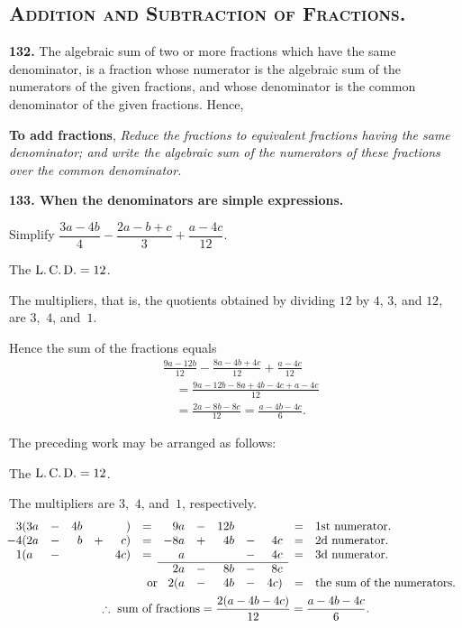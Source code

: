 \documentclass[12pt]{book}[2005/09/16]
\newcommand{\Require}[1][2\baselineskip]{%
  \setlength{\TmpLen}{\pagegoal-\pagetotal}%
  \ifthenelse{\lengthtest{0pt < \TmpLen}\and\lengthtest{\TmpLen < #1}}{%
    \vfil\newpage%
  }{}%
}
\newcommand{\Section}[1]{\subsection*{\centering\normalfont\small\scshape #1}}
\newcommand{\Paragraph}[1]{\medskip\par\textbf{#1}}
\newcommand{\Dictum}[1]{\Require\textbf{#1}}
\newenvironment{Soln}[1][]{\par\small\textsc{#1}}{\par}
\newenvironment{Theorem}[1][]{%
  \ifthenelse{\not\equal{#1}{nopar}}{\smallskip\par#1}{}%
  \itshape}{\medskip\upshape\par}
\newcommand{\Item}[1]{\vspace{4pt plus 16pt}\makebox[1em][r]{\textbf{#1}\ }}
\newlength{\TmpLen}
\newcommand{\LCD}{L.\,C.\,D.}
\begin{document}
\Section{Addition and Subtraction of Fractions.}

\Paragraph{132.}  The algebraic sum of two or more fractions which
have the same denominator, is a fraction whose numerator
is the algebraic sum of the numerators of the given fractions,
and whose denominator is the common denominator
of the given fractions.  Hence,

\Dictum{To add fractions},
\begin{Theorem}
Reduce the fractions to equivalent fractions having the
same denominator; and write the algebraic sum of the
numerators of these fractions over the common denominator.
\end{Theorem}

\Paragraph{133.  When the denominators are simple expressions.}

\Item{1.}  Simplify $\dfrac{3a - 4b}{4} - \dfrac{2a - b + c}{3} + \dfrac{a - 4c}{12}$.
\begin{Soln}
The $\text{\LCD} = 12$.

The multipliers, that is, the quotients obtained by dividing $12$ by
$4$, $3$, and $12$, are $3$,~$4$, and~$1$.

Hence the sum of the fractions equals
\begin{align*}
&\frac{9a - 12b}{12} - \frac{8a - 4b + 4c}{12} + \frac{a - 4c}{12} \\
&\quad= \frac{9a - 12b - 8a + 4b - 4c + a - 4c}{12} \\
&\quad= \frac{2a - 8b-8c}{12} = \frac{a - 4b - 4c}{6}.
\end{align*}
\end{Soln}

The preceding work may be arranged as follows:
\begin{Soln}
The $\text{\LCD} = 12$.

The multipliers are $3$,~$4$, and~$1$, respectively.
\begin{gather*}
\begin{array}{l*{5}{cr}cl}
3(3a &-& 4b & &  ) &=& 9a &-&12b & &    &=& \text{1st numerator.} \\
\llap{$-$}
4(2a &-&  b &+& c) &=&-8a &+& 4b &-& 4c &=& \text{2d numerator.} \\
1( a &-&    & &4c) &=&  a & &    &-& 4c &=& \text{3d numerator.} \\
\cline{7-11}
      & &    & &    & & 2a &-& 8b &-& 8c \\
      & &    & &    &\rlap{or}& 2(a &-& 4b &-& 4c) &=& \text{the sum of the numerators.}
\end{array} \\
\therefore\ \text{sum of fractions} = \frac{2(a - 4b - 4c)}{12} = \frac{a - 4b - 4c}{6}.
\end{gather*}
\end{Soln}
\end{document}
